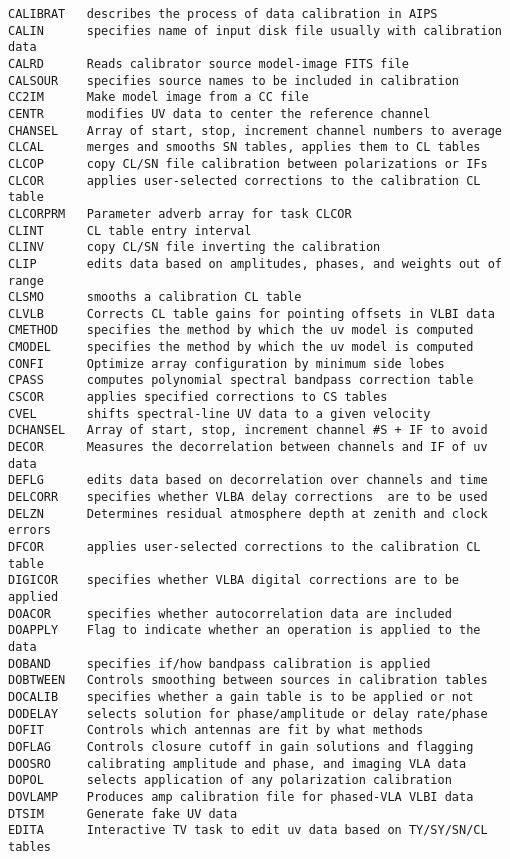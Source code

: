 \begin{verbatim}
CALIBRAT   describes the process of data calibration in AIPS
CALIN      specifies name of input disk file usually with calibration data
CALRD      Reads calibrator source model-image FITS file
CALSOUR    specifies source names to be included in calibration
CC2IM      Make model image from a CC file
CENTR      modifies UV data to center the reference channel
CHANSEL    Array of start, stop, increment channel numbers to average
CLCAL      merges and smooths SN tables, applies them to CL tables
CLCOP      copy CL/SN file calibration between polarizations or IFs
CLCOR      applies user-selected corrections to the calibration CL table
CLCORPRM   Parameter adverb array for task CLCOR
CLINT      CL table entry interval
CLINV      copy CL/SN file inverting the calibration
CLIP       edits data based on amplitudes, phases, and weights out of range
CLSMO      smooths a calibration CL table
CLVLB      Corrects CL table gains for pointing offsets in VLBI data
CMETHOD    specifies the method by which the uv model is computed
CMODEL     specifies the method by which the uv model is computed
CONFI      Optimize array configuration by minimum side lobes
CPASS      computes polynomial spectral bandpass correction table
CSCOR      applies specified corrections to CS tables
CVEL       shifts spectral-line UV data to a given velocity
DCHANSEL   Array of start, stop, increment channel #S + IF to avoid
DECOR      Measures the decorrelation between channels and IF of uv data
DEFLG      edits data based on decorrelation over channels and time
DELCORR    specifies whether VLBA delay corrections  are to be used
DELZN      Determines residual atmosphere depth at zenith and clock errors
DFCOR      applies user-selected corrections to the calibration CL table
DIGICOR    specifies whether VLBA digital corrections are to be applied
DOACOR     specifies whether autocorrelation data are included
DOAPPLY    Flag to indicate whether an operation is applied to the data
DOBAND     specifies if/how bandpass calibration is applied
DOBTWEEN   Controls smoothing between sources in calibration tables
DOCALIB    specifies whether a gain table is to be applied or not
DODELAY    selects solution for phase/amplitude or delay rate/phase
DOFIT      Controls which antennas are fit by what methods
DOFLAG     Controls closure cutoff in gain solutions and flagging
DOOSRO     calibrating amplitude and phase, and imaging VLA data
DOPOL      selects application of any polarization calibration
DOVLAMP    Produces amp calibration file for phased-VLA VLBI data
DTSIM      Generate fake UV data
EDITA      Interactive TV task to edit uv data based on TY/SY/SN/CL tables

\end{verbatim}
